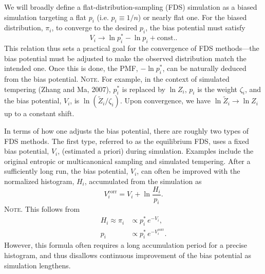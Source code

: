 \documentclass[reprint, superscriptaddress, floatfix]{revtex4-1}
\newcommand{\note}[1]{{\color{DarkGreen}\footnotesize \textsc{Note.} #1}}
\begin{document}
We will broadly define
a flat-distribution-sampling (FDS) simulation
as a biased simulation
targeting a flat $p_i$ (i.e. $p_i \equiv 1/n$)
or nearly flat one\cite{
dayal2004, *trebst2004, *zhang2007, barducci2008, singh2011}.
%
For the biased distribution, $\pi_i$,
to converge to the desired $p_i$,
the bias potential must satisfy
%
\begin{equation}
  V_i \to \ln p^*_i - \ln p_i + \mathrm{const.}
  .
  \label{eq:Vi_target}
\end{equation}
%
%
This relation thus sets a practical goal for the convergence of FDS
methods---the bias potential must be adjusted to make the
observed distribution match the intended one.
Once this is done,
the PMF, $-\ln p^*_i$, can be naturally
deduced from the bias potential. %
\note{
  For example, in the context of simulated tempering (Zhang and Ma, 2007),
  $p^*_i$ is replaced by $\ln Z_i$,
  $p_i$ is the weight $\zeta_i$,
  and the bias potential, $V_i$, is $\ln (\tilde Z_i / \zeta_i)$.
  Upon convergence, we have $\ln \tilde Z_i \to \ln Z_i$
  up to a constant shift.
}



In terms of how one adjusts the bias potential,
there are roughly two types of FDS methods.
%
The first type,
referred to as the equilibrium FDS, %
uses a fixed bias potential, $V_i$,
(estimated a priori)
during simulation.
%
Examples include the original
entropic or multicanonical sampling\cite{
berg1992, *lee1993}
and simulated tempering\cite{
marinari1992, *lyubartsev1992}.
%
After a sufficiently long run, the bias potential, $V_i$,
can often be improved
with the normalized histogram, $H_i$,
accumulated from the simulation as
%
%
\begin{equation}
  V^\mathrm{corr}_i
  =
  V_i
  +
  \ln \frac{ H_i }
           { p_i }.
  \label{eq:vcorr_equil}
\end{equation}
%
\note{This follows from
  $$
  \begin{aligned}
    H_i \approx \pi_i
    &\propto p^*_i \, e^{-V_i},
    \\
    p_i
    &\propto p^*_i \, e^{-V^\mathrm{corr}_i}.
  \end{aligned}
  $$
}
However, this formula often requires a long
accumulation period for a precise histogram,
and thus disallows
continuous improvement of the bias potential
as simulation lengthens.
\end{document}
